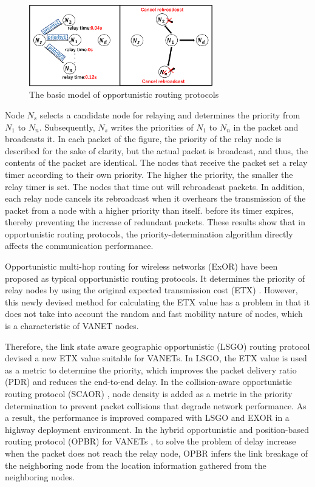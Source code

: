 \documentclass[conference]{IEEEtran}
\begin{document}
\begin{figure}[!ht]
\centering
\includegraphics[width=80mm]{figures/basic-opportunity2.eps}
\caption{The basic model of opportunistic routing protocols}
\label{fig:Basic}
\end{figure}


Node $N_{s}$ selects a candidate node for relaying and determines the priority from $N_{1}$ to $N_{n}$. Subsequently, $N_{s}$ writes the priorities of $N_{1}$ to $N_{n}$ in the packet and broadcasts it. 
In each packet of the figure, the priority of the relay node is described for the sake of clarity, but the actual packet is broadcast, and thus, the contents of the packet are identical. 
The nodes that receive the packet set a relay timer according to their own priority.
The higher the priority, the smaller the relay timer is set.
The nodes that time out will rebroadcast packets.
In addition, each relay node cancels its rebroadcast when it overhears the transmission of the packet from a node with a higher priority than itself.
before its timer expires, thereby preventing the increase of redundant packets.
These results show that in opportunistic routing protocols, the priority-determination algorithm directly affects  the communication performance.


Opportunistic multi-hop routing for wireless
networks (ExOR) \cite{16} have been proposed as typical opportunistic routing protocols. It determines the priority of relay nodes by using the original expected transmission cost (ETX) \cite{21}. However, this newly devised method for calculating the ETX value has a problem in that it does not take into account the random and fast mobility nature of nodes, which is a characteristic of VANET nodes.\par


Therefore, the link state aware geographic opportunistic (LSGO) routing protocol \cite{18} devised a new ETX value suitable for VANETs. In LSGO, the ETX value is used as a metric to determine the priority, which improves the packet delivery ratio (PDR) and reduces the end-to-end delay.
In the collision-aware opportunistic routing protocol (SCAOR) \cite{22}, node density is added as a metric in the priority determination to prevent packet collisions that degrade network performance. 
As a result, the performance is improved compared with LSGO and EXOR in a highway deployment environment. 
In the hybrid opportunistic and position-based routing protocol (OPBR) for VANETs
\cite{23}, to solve the problem of delay increase when the packet does not reach the relay node, OPBR infers the link breakage of the neighboring node from the location information gathered from the neighboring nodes.
\end{document}

